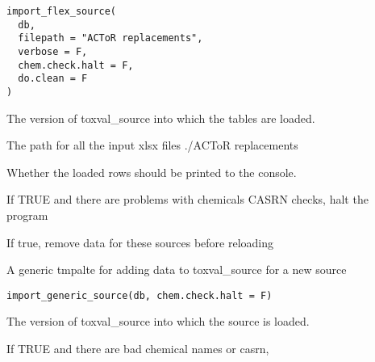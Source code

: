 \documentclass[letterpaper]{book}
\begin{document}
%
\begin{Usage}
\begin{verbatim}
import_flex_source(
  db,
  filepath = "ACToR replacements",
  verbose = F,
  chem.check.halt = F,
  do.clean = F
)
\end{verbatim}
\end{Usage}
%
\begin{Arguments}
\begin{ldescription}
\item[\code{db}] The version of toxval\_source into which the tables are loaded.

\item[\code{filepath}] The path for all the input xlsx files ./ACToR replacements

\item[\code{verbose}] Whether the loaded rows should be printed to the console.

\item[\code{chem.check.halt}] If TRUE and there are problems with chemicals CASRN checks, halt the program

\item[\code{do.clean}] If true, remove data for these sources before reloading
\end{ldescription}
\end{Arguments}
%
\begin{Description}\relax
A generic tmpalte for adding data to toxval\_source for a new source
\end{Description}
%
\begin{Usage}
\begin{verbatim}
import_generic_source(db, chem.check.halt = F)
\end{verbatim}
\end{Usage}
%
\begin{Arguments}
\begin{ldescription}
\item[\code{db}] The version of toxval\_source into which the source is loaded.

\item[\code{chem.check.halt}] If TRUE and there are bad chemical names or casrn,
\end{ldescription}
\end{Arguments}
\end{document}
